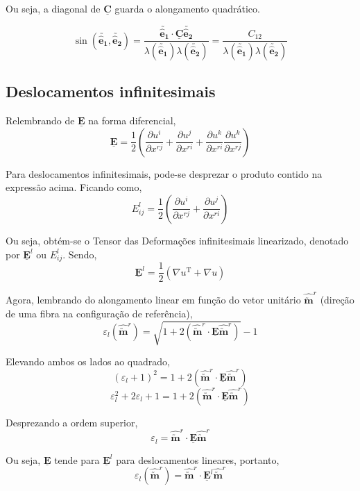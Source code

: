 	Ou seja, a diagonal de $\underline{\mathbf{C}}$ guarda o alongamento quadrático.
	
	\[\sin(\utilde{\mathbf{\hat{e}_1}},\utilde{\mathbf{\hat{e}_2}})=\frac{\utilde{\mathbf{\hat{e}_1}}\cdot\underline{\mathbf{C}}\utilde{\mathbf{\hat{e}_2}}}{\lambda(\utilde{\mathbf{\hat{e}_1}})\lambda(\utilde{\mathbf{\hat{e}_2}})}=\frac{C_{12}}{\lambda(\utilde{\mathbf{\hat{e}_1}})\lambda(\utilde{\mathbf{\hat{e}_2}})}\]
	
	\subsection{Deslocamentos infinitesimais}
	
	Relembrando de $\underline{\mathbf{E}}$ na forma diferencial,
	\[\underline{\mathbf{E}}=\frac{1}{2}\left( \frac{\partial u^i}{\partial x^{rj}}+\frac{\partial u^j}{\partial x^{ri}}+\frac{\partial u^k}{\partial x^{ri}}\frac{\partial u^k}{\partial x^{rj}} \right)\]
	
	Para deslocamentos infinitesimais, pode-se desprezar o produto contido na expressão acima. Ficando como,
	\[E_{ij}^l=\frac{1}{2}\left( \frac{\partial u^i}{\partial x^{rj}}+\frac{\partial u^j}{\partial x^{ri}}\right)\]
	
	Ou seja, obtém-se o Tensor das Deformações infinitesimais linearizado, denotado por $\underline{\mathbf{E}}^l$ ou $E_{ij}^l$. Sendo,
	\[\underline{\mathbf{E}}^l=\frac{1}{2}(\nabla u^{\text{T}}+\nabla u)\]
	
	Agora, lembrando do alongamento linear em função do vetor unitário $\hat{\utilde{\mathbf{m}}}^r$ (direção de uma fibra na configuração de referência),
	\[\varepsilon_l(\hat{\utilde{\mathbf{m}}}^r)=\sqrt{1+2(\hat{\utilde{\mathbf{m}}}^r\cdot\underline{\mathbf{E}}\hat{\utilde{\mathbf{m}}}^r)}-1\]
	
	Elevando ambos os lados ao quadrado,
	\[(\varepsilon_l+1)^2=1+2(\hat{\utilde{\mathbf{m}}}^r\cdot\underline{\mathbf{E}}\hat{\utilde{\mathbf{m}}}^r)\]
	\[\varepsilon_l^2+2\varepsilon_l+1=1+2(\hat{\utilde{\mathbf{m}}}^r\cdot\underline{\mathbf{E}}\hat{\utilde{\mathbf{m}}}^r)\]
	
	Desprezando a ordem superior,
	\[\varepsilon_l=\hat{\utilde{\mathbf{m}}}^r\cdot\underline{\mathbf{E}}\hat{\utilde{\mathbf{m}}}^r\]
	
	Ou seja, $\underline{\mathbf{E}}$ tende para $\underline{\mathbf{E}}^l$ para deslocamentos lineares, portanto,
	\[\varepsilon_l(\hat{\utilde{\mathbf{m}}}^r)=\hat{\utilde{\mathbf{m}}}^r\cdot\underline{\mathbf{E}}^l\hat{\utilde{\mathbf{m}}}^r\]
	
